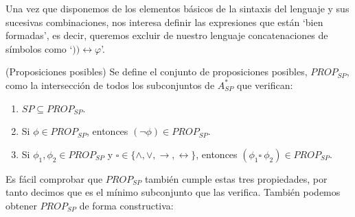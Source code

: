 Una vez que disponemos de los elementos básicos de la sintaxis del lenguaje y sus sucesivas combinaciones, nos interesa definir las expresiones que están `bien formadas', es decir, queremos excluir de nuestro lenguaje  concatenaciones de símbolos como `$)) \leftrightarrow \varphi$'.

\begin{definition}\label{def:PROP_{SP}}(Proposiciones posibles)
Se define el conjunto de proposiciones posibles,  $PROP_{SP}$, como la intersección de todos los subconjuntos de $A_{SP}^*$ que verifican:
\begin{enumerate}
    \item $SP \subseteq PROP_{SP}$.
    \item Si $\phi\in PROP_{SP}$, entonces $(\neg \phi) \in PROP_{SP} $.
    \item Si $\phi_1, \phi_2 \in PROP_{SP}$ y $\square\in \{\land, \lor, \rightarrow, \leftrightarrow\}$, entonces $(\phi_1 \square\  \phi_2) \in PROP_{SP}$.
\end{enumerate}
\end{definition}
Es fácil comprobar que $PROP_{SP}$ también cumple estas tres propiedades, por tanto decimos que es el mínimo subconjunto que las verifica. También podemos obtener $PROP_{SP}$ de forma constructiva:

